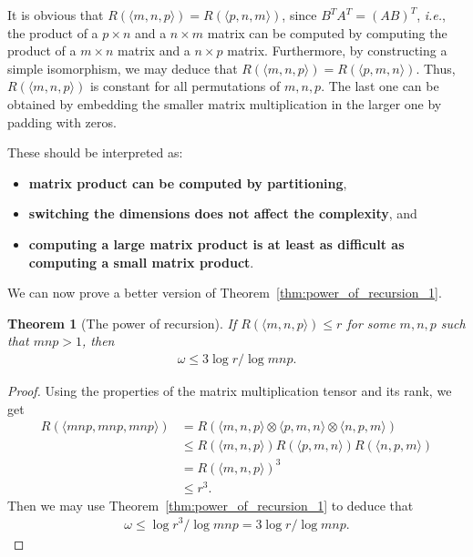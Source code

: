 \documentclass{article}
\theoremstyle{plain}
\newtheorem{theorem}{Theorem}
\theoremstyle{definition}
\theoremstyle{remark}
\begin{document}
It is obvious that $R(\langle m, n, p \rangle) = R(\langle p, n, m \rangle)$, since $B^T A^T = (AB)^T$, \emph{i.e.}, the product of a $p \times n$ and a $n \times m$ matrix can be computed by computing the product of a $m \times n$ matrix and a $n \times p$ matrix. Furthermore, by constructing a simple isomorphism, we may deduce that $R(\langle m, n, p \rangle) = R(\langle p, m, n \rangle)$. Thus, $R(\langle m, n, p \rangle)$ is constant for all permutations of $m, n, p$. The last one can be obtained by embedding the smaller matrix multiplication in the larger one by padding with zeros.

These should be interpreted as: 
\begin{itemize}
    \item \textbf{matrix product can be computed by partitioning},
    \item \textbf{switching the dimensions does not affect the complexity}, and
    \item \textbf{computing a large matrix product is at least as difficult as computing a small matrix product}.
\end{itemize}

We can now prove a better version of Theorem~\ref{thm:power_of_recursion_1}.

\begin{theorem}[The power of recursion]\label{thm:power_of_recursion_2}
If $R(\langle m, n, p \rangle) \leq r$ for some $m, n, p$ such that $mnp > 1$, then
\begin{align*}
    \omega \leq 3 \log r / \log mnp.
\end{align*}
\end{theorem}

\begin{proof}
Using the properties of the matrix multiplication tensor and its rank, we get
\begin{align*}
    R(\langle mnp, mnp, mnp \rangle) &= R(\langle m, n, p \rangle \otimes \langle p, m, n \rangle \otimes \langle n, p, m \rangle) \\
    &\leq R(\langle m, n, p \rangle)R(\langle p, m, n \rangle)R(\langle n, p, m \rangle) \\
    &= R(\langle m, n, p \rangle)^3 \\
    &\leq r^3.
\end{align*}
Then we may use Theorem~\ref{thm:power_of_recursion_1} to deduce that
\begin{align*}
    \omega \leq \log r^3 / \log mnp = 3 \log r / \log mnp.
\end{align*}
\end{proof}
\end{document}
